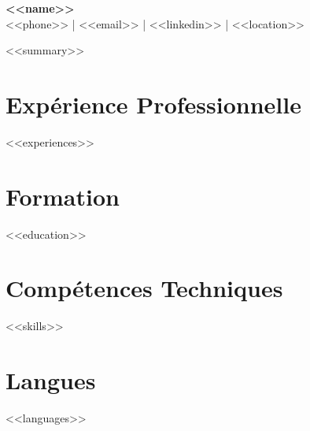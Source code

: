 \documentclass[11pt,a4paper]{article}
\begin{document}
\begin{center}
{\LARGE\bfseries <<name>>}\\[4pt]
{\color{light}\small <<phone>> \enspace | \enspace <<email>> \enspace | \enspace <<linkedin>> \enspace | \enspace <<location>>}
\end{center}

\vspace{2pt}

{\color{light}\small <<summary>>}

\section{Exp\'erience Professionnelle}
<<experiences>>

\section{Formation}
<<education>>

\section{Comp\'etences Techniques}
<<skills>>

\section{Langues}
<<languages>>
\end{document}
